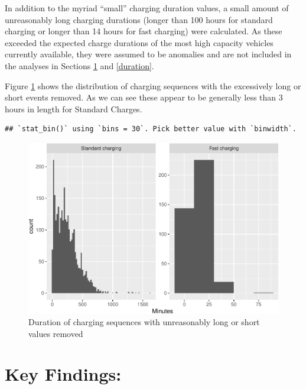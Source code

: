 \documentclass[]{article}
\begin{document}
In addition to the myriad ``small'' charging duration values, a small
amount of unreasonably long charging durations (longer than 100 hours
for standard charging or longer than 14 hours for fast charging) were
calculated. As these exceeded the expected charge durations of the most
high capacity vehicles currently available, they were assumed to be
anomalies and are not included in the analyses in Sections
\ref{keyFindings} and \ref{duration}.

Figure \ref{fig:longDuration} shows the distribution of charging
sequences with the excessively long or short events removed. As we can
see these appear to be generally less than 3 hours in length for
Standard Charges.

\begin{verbatim}
## `stat_bin()` using `bins = 30`. Pick better value with `binwidth`.
\end{verbatim}

\begin{figure}
\centering
\includegraphics{EVBB_report_files/figure-latex/longDuration-1.pdf}
\caption{\label{fig:longDuration}Duration of charging sequences with
unreasonably long or short values removed}
\end{figure}

\section{Key Findings:}\label{keyFindings}
\end{document}
